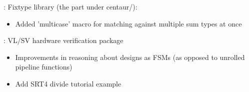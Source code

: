 
\begin{frame}

\implibtitle

:
Fixtype library (the part under centaur/):
\begin{itemize}
\item Added 'multicase' macro for matching against multiple sum types at once
\end{itemize}

\end{frame}


\begin{frame}

\implibtitle

:
VL/SV hardware verification package
\begin{itemize}
\item Improvements in reasoning about designs as FSMs (as opposed to unrolled pipeline functions)
\item Add SRT4 divide tutorial example

\end{itemize}

\end{frame}


